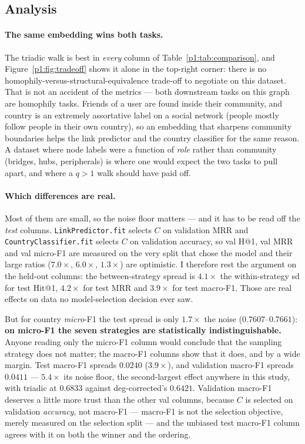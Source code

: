 \subsection{Analysis}
\label{p1:sec:analysis}

\paragraph{The same embedding wins both tasks.}
The triadic walk is best in \emph{every} column of Table~\ref{p1:tab:comparison}, and
Figure~\ref{p1:fig:tradeoff} shows it alone in the top-right corner: there is no
homophily-versus-structural-equivalence trade-off to negotiate on this dataset.  That is
not an accident of the metrics --- both downstream tasks on this graph are homophily
tasks.  Friends of a user are found inside their community, and country is an extremely
assortative label on a social network (people mostly follow people in their own country),
so an embedding that sharpens community boundaries helps the link predictor and the
country classifier for the same reason.  A dataset where node labels were a function of
\emph{role} rather than community (bridges, hubs, peripherals) is where one would expect
the two tasks to pull apart, and where a $q>1$ walk should have paid off.

\paragraph{Which differences are real.}
Most of them are small, so the noise floor matters --- and it has to be read off the
\emph{test} columns.  \texttt{LinkPredictor.fit} selects $C$ on validation MRR and
\texttt{CountryClassifier.fit} selects $C$ on validation accuracy, so val H@1, val MRR and
val micro-F1 are measured on the very split that chose the model and their large ratios
($7.0\times$, $6.0\times$, $1.3\times$) are optimistic.  I therefore rest the argument on
the held-out columns: the between-strategy spread is $4.1\times$ the within-strategy sd
for test Hit@1, $4.2\times$ for test MRR and $3.9\times$ for test macro-F1.  Those are
real effects on data no model-selection decision ever saw.

But for country \emph{micro}-F1 the test spread is only $1.7\times$ the noise
($0.7607$--$0.7661$): \textbf{on micro-F1 the seven strategies are statistically
indistinguishable.}  Anyone reading only the micro-F1 column would conclude that the
sampling strategy does not matter; the macro-F1 columns show that it does, and by a wide
margin.  Test macro-F1 spreads $0.0240$ ($3.9\times$), and validation macro-F1 spreads
$0.0411$ --- $5.4\times$ its noise floor, the second-largest effect anywhere in this study,
with triadic at $0.6833$ against deg-corrected's $0.6421$.  Validation macro-F1 deserves a
little more trust than the other val columns, because $C$ is selected on validation
\emph{accuracy}, not macro-F1 --- macro-F1 is not the selection objective, merely measured
on the selection split --- and the unbiased test macro-F1 column agrees with it on both the
winner and the ordering.

